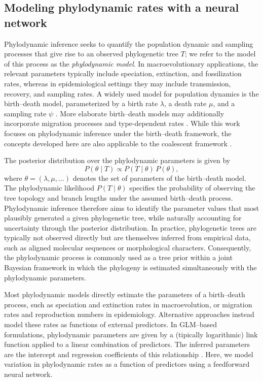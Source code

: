 \subsection{Modeling phylodynamic rates with a neural network}

Phylodynamic inference seeks to quantify the population dynamic and sampling processes that give rise to an observed phylogenetic tree $T$; we refer to the model of this process as the \emph{phylodynamic model}.
In macroevolutionary applications, the relevant parameters typically include speciation, extinction, and fossilization rates, whereas in epidemiological settings they may include transmission, recovery, and sampling rates.
A widely used model for population dynamics is the birth--death model, parameterized by a birth rate $\lambda$, a death rate $\mu$, and a sampling rate $\psi$ \cite{stadler2013uncovering}.
More elaborate birth--death models may additionally incorporate migration processes and type-dependent rates \cite{Vaughan2025BDMM}.
While this work focuses on phylodynamic inference under the birth--death framework, the concepts developed here are also applicable to the coalescent framework \cite{kingman1982coalescent}.

The posterior distribution over the phylodynamic parameters is given by
\[
    P(\theta \mid T)
    \propto
    P(T \mid \theta)\,
    P(\theta),
\]
where $\theta = (\lambda, \mu, \ldots)$ denotes the set of parameters of the birth--death model.
The phylodynamic likelihood $P(T \mid \theta)$ specifies the probability of observing the tree topology and branch lengths under the assumed birth--death process.
Phylodynamic inference therefore aims to identify the parameter values that most plausibly generated a given phylogenetic tree, while naturally accounting for uncertainty through the posterior distribution.
In practice, phylogenetic trees are typically not observed directly but are themselves inferred from empirical data, such as aligned molecular sequences or morphological characters.
Consequently, the phylodynamic process is commonly used as a tree prior within a joint Bayesian framework in which the phylogeny is estimated simultaneously with the phylodynamic parameters.

Most phylodynamic models directly estimate the parameters of a birth--death process, such as speciation and extinction rates in macroevolution, or migration rates and reproduction numbers in epidemiology.
Alternative approaches instead model these rates as functions of external predictors.
In GLM–based formulations, phylodynamic parameters are given by a (tipically logarithmic) link function applied to a linear combination of predictors.
The inferred parameters are the intercept and regression coefficients of this relationship \cite{lemey2014unifying, muller2019inferring, valenzuela2021comprehensive}.
Here, we model variation in phylodynamic rates as a function of predictors using a feedforward neural network.

